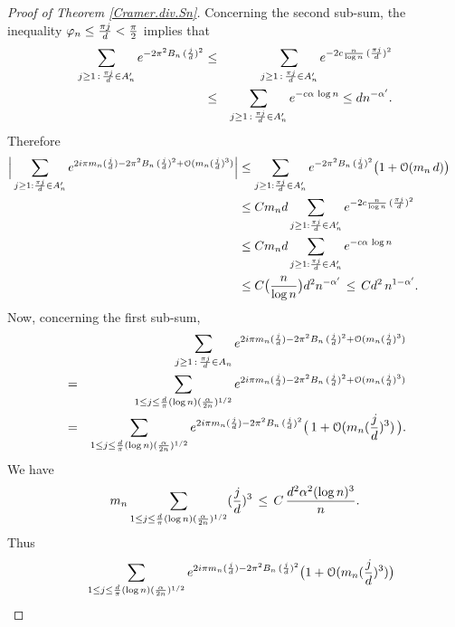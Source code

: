 \documentclass[11pt,draft,reqno]{amsart}
\theoremstyle{definition}
\theoremstyle{remarks}
\numberwithin{equation}{section}
\def \a{{\alpha}}
\def \p{{\varphi}}
\begin{document}
\begin{proof}[Proof of Theorem \ref{Cramer.div.Sn}]
  Concerning the second sub-sum,
the inequality $\p_n
\le {\pi j\over d}<{\pi \over 2}$ implies that  
\begin{eqnarray*}  \sum_{ j\ge 1\, :\, { \pi j\over d}\in A'_n} e^{ - 2\pi^2  B_n\,(\frac{j}{d})^2}&\le&
\sum_{ j\ge 1\, :\, { \pi j\over d}\in A'_n} e^{ - 2c   \frac{n}{\log n}\,(\frac{\pi j}{d})^2}
\cr &\le&\sum_{ j\ge 1\, :\,{ \pi j\over d}\in A'_n} e^{ -  c\a   \,  \log n       }\le
dn^{-  \a'  }.
\end{eqnarray*}
Therefore 
\begin{align*}  \Big| \sum_{ j\ge 1: { \pi j\over d}\in A'_n}  e^{ 2i \pi m_n(\frac{j}{d})  - 2\pi^2  B_n\,(\frac{j}{d})^2+\mathcal O (m_n(\frac{j}{d})^3 ) }\Big|
  &\le    \sum_{ j\ge 1:{ \pi j\over d}\in A'_n}  e^{  
 - 2\pi^2  B_n\,(\frac{j}{d})^2}\big(1   + \mathcal O ( m_n\,d ) \big)\cr &\le 
Cm_nd \sum_{ j\ge 1:{ \pi j\over d}\in A'_n} e^{ - 2c   \frac{n}{\log n}\,(\frac{\pi j}{d})^2}
\cr &\le Cm_nd\sum_{ j\ge 1: { \pi j\over d}\in A'_n} e^{ -  c\a   \,  \log n       }
\cr &\le C\big( \frac{n}{\log n}\big)d^2
 n^{-  \a'  }\, \le \, C d^2\,n^{1-  \a'  }.
\end{align*}
Now, concerning the first sub-sum, 
\begin{eqnarray*}& &  \sum_{ j\ge 1\, :\, { \pi j\over d}\in A_n}  e^{ 2i \pi m_n(\frac{j}{d})  -  2\pi^2  B_n\,(\frac{j}{d})^2+\mathcal O (m_n(\frac{j}{d})^3 ) } 
\cr &= &\sum_{  1\le  j\le \frac{d}{\pi}( \log n)  ( { \a \over 2 n} )^{1/2}}e^{ 2i \pi m_n(\frac{j}{d})  - 2\pi^2  B_n\,(\frac{j}{d})^2+\mathcal O (m_n(\frac{j}{d})^3 ) }
\cr &=& \sum_{  1\le  j\le \frac{d}{\pi}( \log n)  ( { \a \over 2 n} )^{1/2}}e^{ 2i \pi m_n(\frac{j}{d})  - 2\pi^2  B_n\,(\frac{j}{d})^2  }\big(\,1+ \mathcal O (m_n(\frac{j}{d})^3 )\,\big)
.
\end{eqnarray*}
We have 
\begin{equation*} m_n  \sum_{  1\le  j\le \frac{d}{\pi}( \log n)  ( { \a \over 2 n} )^{1/2}}(\frac{j}{d})^3\,\le\, C\, \frac{d^2 \a^2(\log n)^3}{n} .
\end{equation*}
Thus
\begin{eqnarray*}&&\sum_{  1\le  j\le \frac{d}{\pi}( \log n)  ( { \a \over 2 n} )^{1/2}}
 e^{ 2i \pi m_n(\frac{j}{d})  - 2\pi^2  B_n\,(\frac{j}{d})^2  }\big(1+ \mathcal O (m_n(\frac{j}{d})^3 )\big) 

\end{eqnarray*}
\end{proof}
\end{document}
